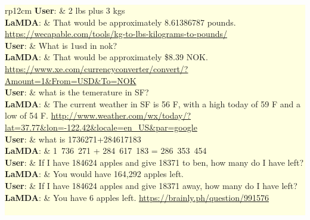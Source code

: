 \documentclass{article}
\begin{document}
\begin{table}[ht!]
\small
\centering
\colorbox{lightyellow}{

\begin{tabular}{rp{12cm}}
\textbf{User}: & 2 lbs plus 3 kgs \\
\textbf{LaMDA}: & That would be approximately 8.61386787 pounds. \url{https://wecapable.com/tools/kg-to-lbs-kilograms-to-pounds/} \\
\textbf{User}: & What is 1usd in nok? \\
\textbf{LaMDA}: & That would be approximately \$8.39 NOK. \url{https://www.xe.com/currencyconverter/convert/?Amount=1&From=USD&To=NOK} \\
\textbf{User}: & what is the temerature in SF? \\
\textbf{LaMDA}: & The current weather in SF is 56 F, with a high today of 59 F and a low of 54 F. \url{http://www.weather.com/wx/today/?lat=37.77&lon=-122.42&locale=en_US&par=google} \\
\textbf{User}: & what is 1736271+284617183 \\
\textbf{LaMDA}: & 1 736 271 + 284 617 183 = 286 353 454 \\
\textbf{User}: & If I have 184624 apples and give 18371 to ben, how many do I have left? \\
\textbf{LaMDA}: & You would have 164,292 apples left. \\
\textbf{User}: & If I have 184624 apples and give 18371 away, how many do I have left? \\
\textbf{LaMDA}: & You have 6 apples left. \url{https://brainly.ph/question/991576} \\
\\
\end{tabular}
}
\caption{A user probes LaMDA's ability to handle external grounding and reasoning; the model answers the first four questions correctly, but misses the fifth.}
\label{tab:example-conv8}
\end{table}
\end{document}
